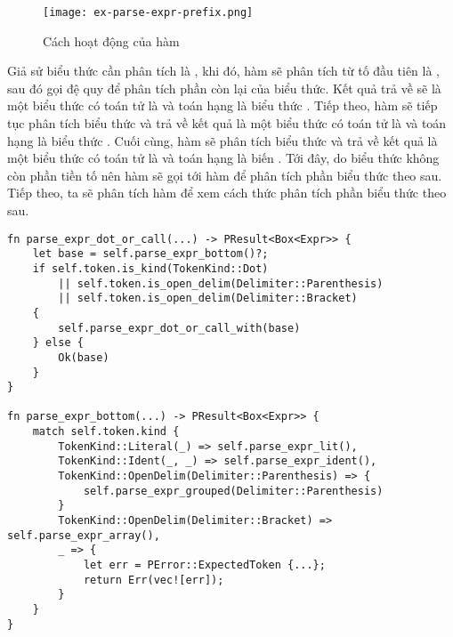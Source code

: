 \begin{figure}[H]
    \centering
    \texttt{[image: ex-parse-expr-prefix.png]}
    \caption{Cách hoạt động của hàm }
\end{figure}

Giả sử biểu thức cần phân tích là , khi đó, hàm  sẽ phân tích từ tố đầu tiên là \kw{!}, sau đó gọi đệ quy để phân tích phần còn lại của biểu thức. Kết quả trả về sẽ là một biểu thức có toán tử là  và toán hạng là biểu thức . Tiếp theo, hàm  sẽ tiếp tục phân tích biểu thức  và trả về kết quả là một biểu thức có toán tử là  và toán hạng là biểu thức . Cuối cùng, hàm  sẽ phân tích biểu thức  và trả về kết quả là một biểu thức có toán tử là  và toán hạng là biến . Tới đây, do biểu thức không còn phần tiền tố nên hàm  sẽ gọi tới hàm  để phân tích phần biểu thức theo sau. Tiếp theo, ta sẽ phân tích hàm  để xem cách thức phân tích phần biểu thức theo sau.

\begin{lstlisting}[]
fn parse_expr_dot_or_call(...) -> PResult<Box<Expr>> {
    let base = self.parse_expr_bottom()?;
    if self.token.is_kind(TokenKind::Dot)
        || self.token.is_open_delim(Delimiter::Parenthesis)
        || self.token.is_open_delim(Delimiter::Bracket)
    {
        self.parse_expr_dot_or_call_with(base)
    } else {
        Ok(base)
    }
}

fn parse_expr_bottom(...) -> PResult<Box<Expr>> {
    match self.token.kind {
        TokenKind::Literal(_) => self.parse_expr_lit(),
        TokenKind::Ident(_, _) => self.parse_expr_ident(),
        TokenKind::OpenDelim(Delimiter::Parenthesis) => {
            self.parse_expr_grouped(Delimiter::Parenthesis)
        }
        TokenKind::OpenDelim(Delimiter::Bracket) => self.parse_expr_array(),
        _ => {
            let err = PError::ExpectedToken {...};
            return Err(vec![err]);
        }
    }
}
\end{lstlisting}

